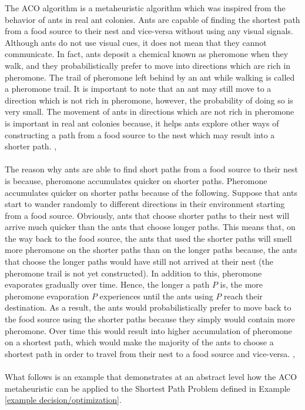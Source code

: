 \documentclass[12pt]{article}
\numberwithin{equation}{subsection}
\numberwithin{table}{subsection}
\numberwithin{algorithm}{subsection}
\numberwithin{figure}{subsection}
\begin{document}
The ACO algorithm is a metaheuristic algorithm which was inspired from the behavior of ants in real ant colonies. Ants are capable of finding the shortest path from a food source to their nest and vice-versa without using any visual signals. Although ants do not use visual cues, it does not mean that they cannot communicate. In fact, ants deposit a chemical known as pheromone when they walk, and they probabilistically prefer to move into directions which are rich in pheromone. The trail of pheromone left behind by an ant while walking is called a pheromone trail. It is important to note that an ant may still move to a direction which is not rich in pheromone, however, the probability of doing so is very small. The movement of ants in directions which are not rich in pheromone is important in real ant colonies because, it helps ants explore other ways of constructing a path from a food source to the nest which may result into a shorter path. \cite{dorigo_gambardella_1997}, \cite{dorigo_stutzle_thomas_2004}\\\\ 
The reason why ants are able to find short paths from a food source to their nest is because, pheromone accumulates quicker on shorter paths. Pheromone accumulates quicker on shorter paths because of the following. Suppose that ants start to wander randomly to different directions in their environment starting from a food source. Obviously, ants that choose shorter paths to their nest will arrive much quicker than the ants that choose longer paths. This means that, on the way back to the food source, the ants that used the shorter paths will smell more pheromone on the shorter paths than on the longer paths because, the ants that choose the longer paths would have still not arrived at their nest (the pheromone trail is not yet constructed). In addition to this, pheromone evaporates gradually over time. Hence, the longer a path $P$ is, the more pheromone evaporation $P$ experiences until the ants using $P$ reach their destination. As a result, the ants would probabilistically prefer to move back to the food source using the shorter paths because they simply would contain more pheromone. Over time this would result into higher accumulation of pheromone on a shortest path, which would make the majority of the ants to choose a shortest path in order to travel from their nest to a food source and vice-versa. \cite{dorigo_gambardella_1997}, \cite{dorigo_stutzle_thomas_2004}\\\\
What follows is an example that demonstrates at an abstract level how the ACO metaheuristic can be applied to the Shortest Path Problem defined in Example \ref{example decision/optimization}.
\end{document}
